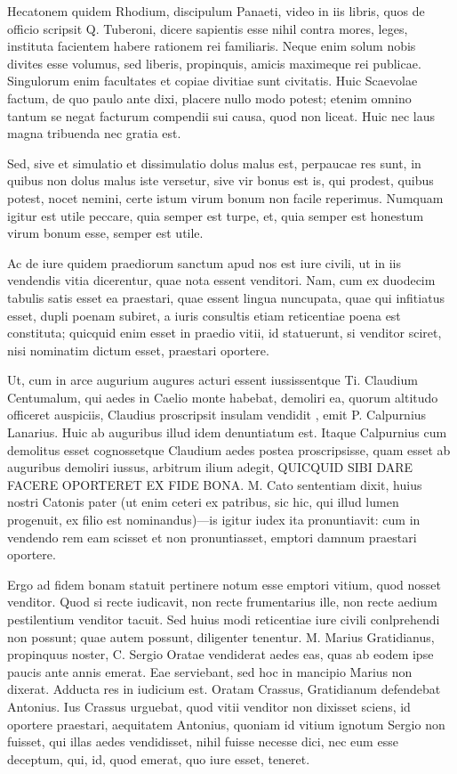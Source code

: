 Hecatonem quidem Rhodium, discipulum Panaeti, video in iis libris, quos de officio scripsit Q. Tuberoni, dicere sapientis esse nihil contra mores, leges, instituta facientem habere rationem rei familiaris. Neque enim solum nobis divites esse volumus, sed liberis, propinquis, amicis maximeque rei publicae. Singulorum enim facultates et copiae divitiae sunt civitatis. Huic Scaevolae factum, de quo paulo ante dixi, placere nullo modo potest; etenim omnino tantum se negat facturum compendii sui causa, quod non liceat. Huic nec laus magna tribuenda nec gratia est.

 Sed, sive et simulatio et dissimulatio dolus malus est, perpaucae res sunt, in quibus non dolus malus iste versetur, sive vir bonus est is, qui prodest, quibus potest, nocet nemini, certe istum virum bonum non facile reperimus. Numquam igitur est utile peccare, quia semper est turpe, et, quia semper est honestum virum bonum esse, semper est utile.

 Ac de iure quidem praediorum sanctum apud nos est iure civili, ut in iis vendendis vitia dicerentur, quae nota essent venditori. Nam, cum ex duodecim tabulis satis esset ea praestari, quae essent lingua nuncupata, quae qui infitiatus esset, dupli poenam subiret, a iuris consultis etiam reticentiae poena est constituta; quicquid enim esset in praedio vitii, id statuerunt, si venditor sciret, nisi nominatim dictum esset, praestari oportere.

 Ut, cum in arce augurium augures acturi essent iussissentque Ti. Claudium Centumalum, qui aedes in Caelio monte habebat, demoliri ea, quorum altitudo officeret auspiciis, Claudius proscripsit insulam vendidit , emit P. Calpurnius Lanarius. Huic ab auguribus illud idem denuntiatum est. Itaque Calpurnius cum demolitus esset cognossetque Claudium aedes postea proscripsisse, quam esset ab auguribus demoliri iussus, arbitrum ilium adegit, QUICQUID SIBI DARE FACERE OPORTERET EX FIDE BONA. M. Cato sententiam dixit, huius nostri Catonis pater (ut enim ceteri ex patribus, sic hic, qui illud lumen progenuit, ex filio est nominandus)—is igitur iudex ita pronuntiavit: cum in vendendo rem eam scisset et non pronuntiasset, emptori damnum praestari oportere.

 Ergo ad fidem bonam statuit pertinere notum esse emptori vitium, quod nosset venditor. Quod si recte iudicavit, non recte frumentarius ille, non recte aedium pestilentium venditor tacuit. Sed huius modi reticentiae iure civili conlprehendi non possunt; quae autem possunt, diligenter tenentur. M. Marius Gratidianus, propinquus noster, C. Sergio Oratae vendiderat aedes eas, quas ab eodem ipse paucis ante annis emerat. Eae serviebant, sed hoc in mancipio Marius non dixerat. Adducta res in iudicium est. Oratam Crassus, Gratidianum defendebat Antonius. Ius Crassus urguebat, quod vitii venditor non dixisset sciens, id oportere praestari, aequitatem Antonius, quoniam id vitium ignotum Sergio non fuisset, qui illas aedes vendidisset, nihil fuisse necesse dici, nec eum esse deceptum, qui, id, quod emerat, quo iure esset, teneret.

